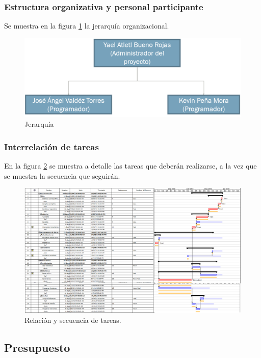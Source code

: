 \documentclass[]{article}
\begin{document}
\subsubsection{Estructura organizativa y personal participante}
Se muestra en la figura \ref{estructura} la jerarqu\'ia organizacional.
\begin{figure}[H]
	
	\centering
	\includegraphics[width=1\textwidth]{estructura}
	\caption{Jerarqu\'ia} 
	\label{estructura}
	
\end{figure} 
\subsubsection{Interrelaci\'on de tareas}
En la figura \ref{rel} se muestra a detalle las tareas que deber\'an realizarse, a la vez que se muestra la secuencia que seguir\'an. 
\begin{figure}[H]
	
	\centering
	\includegraphics[width=1\textwidth]{relacion}
	\caption{Relaci\'on y secuencia de tareas.} 
	\label{rel}
	
\end{figure} 
\subsection{Presupuesto}
\end{document}
